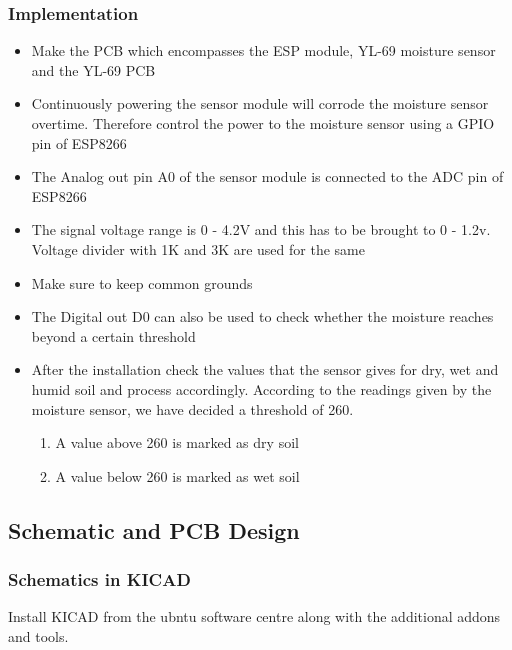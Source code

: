 \documentclass[16pt]{article}
\begin{document}
\subsubsection{Implementation}

\begin{itemize}

\item
  Make the PCB which encompasses the ESP module, YL-69 moisture sensor
  and the YL-69 PCB
\item
  Continuously powering the sensor module will corrode the moisture
  sensor overtime. Therefore control the power to the moisture sensor
  using a GPIO pin of ESP8266
\item
  The Analog out pin A0 of the sensor module is connected to the ADC pin
  of ESP8266
\item
  The signal voltage range is 0 - 4.2V and this has to be brought to 0 -
  1.2v. Voltage divider with 1K and 3K are used for the same
\item
  Make sure to keep common grounds
\item
  The Digital out D0 can also be used to check whether the moisture
  reaches beyond a certain threshold
\item
  After the installation check the values that the sensor gives for dry,
  wet and humid soil and process accordingly. According to the readings given by the 
  moisture sensor, we have decided a threshold of 260. 
\begin{enumerate}
 \item A value above 260 is marked as dry soil
 \item A value below 260 is marked as wet soil 
\end{enumerate}


  
\end{itemize}

\vspace{0.5cm}

\subsection{Schematic and PCB
Design}



\subsubsection{Schematics in KICAD}
Install KICAD from the ubntu software centre along with the additional
addons and tools.
\end{document}

